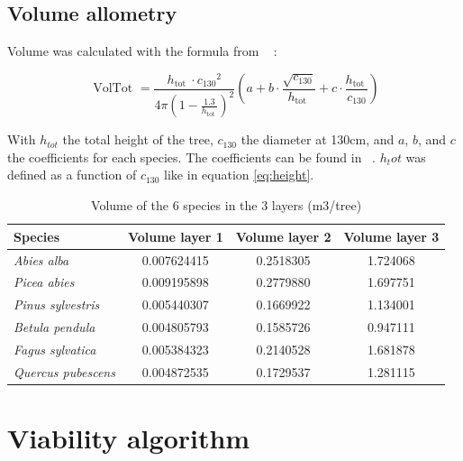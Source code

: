 \documentclass{article}
\begin{document}
\subsection{Volume allometry}

Volume was calculated with the formula from ~\autocite{deleuzeEstimerVolumeTotal2014} :

\begin{equation}
    \text { VolTot }=\frac{h_{\text {tot }} \cdot c_{130}{ }^2}{4 \pi\left(1-\frac{1.3}{h_{\text {tot }}}\right)^2}\left(a+b \cdot \frac{\sqrt{c_{130}}}{h_{\text {tot }}}+c \cdot \frac{h_{\text {tot }}}{c_{130}}\right)
\end{equation}

With $h_{tot}$ the total height of the tree, $c_{130}$ the diameter at 130cm, and $a$, $b$, and $c$ the coefficients for each species. The coefficients can be found in ~\autocite{deleuzeEstimerVolumeTotal2014}. $h_tot$ was defined as a function of $c_{130}$ like in equation \ref{eq:height}. 

\begin{table}[]
    \centering
    \begin{tabular}{lccc}
    \hline
    \hline
    \textbf{Species} & \textbf{Volume layer 1} & \textbf{Volume layer 2} & \textbf{Volume layer 3} \\
    \hline
    \textit{Abies alba} & 0.007624415 & 0.2518305 & 1.724068 \\
    \textit{Picea abies} & 0.009195898 & 0.2779880 & 1.697751 \\
    \textit{Pinus sylvestris} & 0.005440307 & 0.1669922 & 1.134001 \\
    \textit{Betula pendula} & 0.004805793 & 0.1585726 & 0.947111 \\
    \textit{Fagus sylvatica} & 0.005384323 & 0.2140528 & 1.681878 \\
    \textit{Quercus pubescens} & 0.004872535 & 0.1729537 & 1.281115 \\
    \hline
    \hline
    \end{tabular}
    \caption{Volume of the 6 species in the 3 layers (m3/tree)}
    \label{tab:volume}
\end{table}

\clearpage

\section{Viability algorithm}
\end{document}

